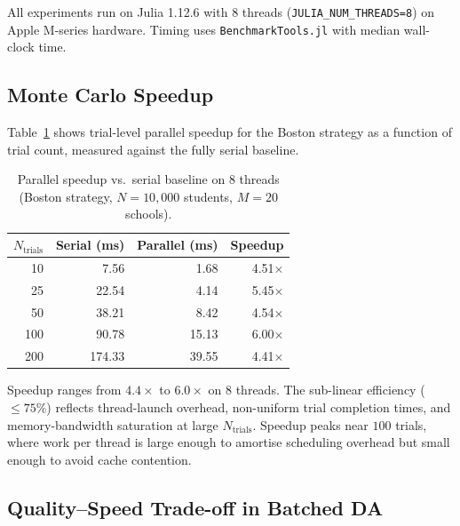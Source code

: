 \documentclass{article}
\theoremstyle{plain}
\theoremstyle{definition}
\theoremstyle{remark}
\begin{document}
All experiments run on Julia 1.12.6 with 8 threads
(\texttt{JULIA\_NUM\_THREADS=8}) on Apple M-series hardware.
Timing uses \texttt{BenchmarkTools.jl} with median wall-clock time.

\subsection{Monte Carlo Speedup}

Table~\ref{tab:speedup} shows trial-level parallel speedup for the Boston
strategy as a function of trial count, measured against the fully serial
baseline.

\begin{table}[t]
\caption{Parallel speedup vs.\ serial baseline on 8 threads (Boston strategy,
$N = 10{,}000$ students, $M = 20$ schools).}
\label{tab:speedup}
\vskip 0.15in
\begin{center}
\begin{small}
\begin{sc}
\begin{tabular}{rrrr}
\toprule
$N_\text{trials}$ & Serial (ms) & Parallel (ms) & Speedup \\
\midrule
 10  &   7.56  &   1.68  & 4.51$\times$ \\
 25  &  22.54  &   4.14  & 5.45$\times$ \\
 50  &  38.21  &   8.42  & 4.54$\times$ \\
100  &  90.78  &  15.13  & 6.00$\times$ \\
200  & 174.33  &  39.55  & 4.41$\times$ \\
\bottomrule
\end{tabular}
\end{sc}
\end{small}
\end{center}
\vskip -0.1in
\end{table}

Speedup ranges from $4.4\times$ to $6.0\times$ on 8 threads. The
sub-linear efficiency ($\leq 75\%$) reflects thread-launch overhead,
non-uniform trial completion times, and memory-bandwidth saturation at large
$N_\text{trials}$. Speedup peaks near $100$ trials, where work per thread is
large enough to amortise scheduling overhead but small enough to avoid
cache contention.

\subsection{Quality--Speed Trade-off in Batched DA}
\end{document}
